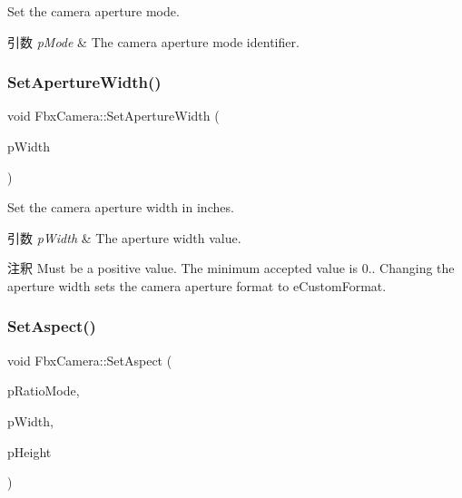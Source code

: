 Set the camera aperture mode. 
\begin{DoxyParams}{引数}
{\em p\+Mode} & The camera aperture mode identifier. \\
\hline
\end{DoxyParams}
\mbox{\label{class_fbx_camera_ae927c1d64d3b28cce554d47ac56fdc92}} 
\subsubsection{\texorpdfstring{Set\+Aperture\+Width()}{SetApertureWidth()}}
{\footnotesize\ttfamily void Fbx\+Camera\+::\+Set\+Aperture\+Width (\begin{DoxyParamCaption}\item[{double}]{p\+Width }\end{DoxyParamCaption})}

Set the camera aperture width in inches. 
\begin{DoxyParams}{引数}
{\em p\+Width} & The aperture width value. \\
\hline
\end{DoxyParams}
\begin{DoxyRemark}{注釈}
Must be a positive value. The minimum accepted value is 0.. Changing the aperture width sets the camera aperture format to e\+Custom\+Format. 
\end{DoxyRemark}
\mbox{\label{class_fbx_camera_adb9cf67e4b59463add6a052003797392}} 
\subsubsection{\texorpdfstring{Set\+Aspect()}{SetAspect()}}
{\footnotesize\ttfamily void Fbx\+Camera\+::\+Set\+Aspect (\begin{DoxyParamCaption}\item[{\hyperlink{class_fbx_camera_a2135478bb5fd6985835c14b11e1fccda}{E\+Aspect\+Ratio\+Mode}}]{p\+Ratio\+Mode,  }\item[{double}]{p\+Width,  }\item[{double}]{p\+Height }\end{DoxyParamCaption})}

